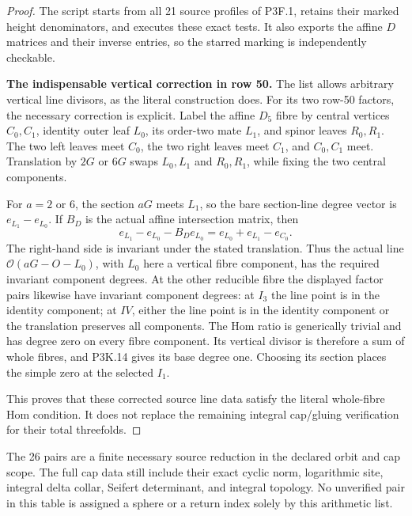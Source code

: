 \begin{proof}
The script  starts
from all 21 source profiles of P3F.1, retains their marked
height denominators, and executes these exact tests.  It
also exports the affine \(D\) matrices and their inverse
entries, so the starred marking is independently checkable.

\par\medskip\noindent\textbf{The indispensable vertical correction in row 50.}\enspace
The list allows arbitrary vertical line divisors, as the
literal construction does.  For its two row-50 factors,
the necessary correction is explicit.  Label the affine
\(D_5\) fibre by central vertices \(C_0,C_1\),
identity outer leaf \(L_0\), its order-two mate \(L_1\),
and spinor leaves \(R_0,R_1\).  The two left leaves
meet \(C_0\), the two right leaves meet \(C_1\),
and \(C_0,C_1\) meet.  Translation by \(2G\) or
\(6G\) swaps \(L_0,L_1\) and \(R_0,R_1\),
while fixing the two central components.

For \(a=2\) or \(6\), the section \(aG\) meets
\(L_1\), so the bare section-line degree vector is
\(e_{L_1}-e_{L_0}\).  If \(B_D\) is the actual
affine intersection matrix, then
\[
 e_{L_1}-e_{L_0}-B_D e_{L_0}
                  =e_{L_0}+e_{L_1}-e_{C_0}.          \tag{P3K.21.2}
\]
The right-hand side is invariant under the stated
translation.  Thus the actual line
\(\mathcal O(aG-O-L_0)\), with \(L_0\) here a
vertical fibre component, has the required invariant
component degrees.  At the other reducible fibre the
displayed factor pairs likewise have invariant component
degrees: at \(I_3\) the line point is in the identity
component; at \(IV\), either the line point is in the
identity component or the translation preserves all
components.  The Hom ratio is generically trivial and
has degree zero on every fibre component.  Its vertical
divisor is therefore a sum of whole fibres, and P3K.14
gives its base degree one.  Choosing its section places
the simple zero at the selected \(I_1\).

This proves that these corrected source line data satisfy
the literal whole-fibre Hom condition.  It does not
replace the remaining integral cap/gluing verification
for their total threefolds.
\end{proof}

The 26 pairs are a finite necessary source reduction in
the declared orbit and cap scope.  The full cap data still
include their exact cyclic norm, logarithmic site, integral
delta collar, Seifert determinant, and integral topology.
No unverified pair in this table is assigned a sphere or
a return index solely by this arithmetic list.

